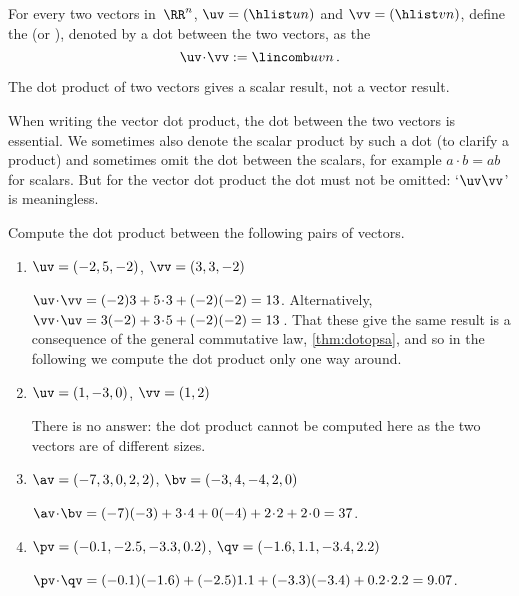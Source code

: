 \begin{definition} \label{def:dotprod}
For every two vectors in~\(\RR^n\), $\uv=(\hlist un)$ and $\vv=(\hlist vn)$,
define the  (or ), denoted by a dot between the two vectors, as the 
\begin{equation*}
\uv\cdot \vv:= \lincomb uvn\,.
\end{equation*}
\end{definition}

The dot product of two vectors gives a scalar result, not a vector result.

When writing the vector dot product, the dot between the two vectors is essential.
We sometimes also denote the scalar product by such a dot (to clarify a product) and sometimes omit the dot between the scalars, for example \(a\cdot b=ab\) for scalars. 
But for the vector dot product the dot must not be omitted: `\(\uv\vv\)' is meaningless.


\begin{example} \label{eg:}
Compute the dot product between the following pairs of vectors.
\begin{enumerate}
\item \(\uv=(-2,5,-2)\), \(\vv=(3,3,-2)\)
\begin{solution} 
\(\uv\cdot\vv=(-2)3+5\cdot3+(-2)(-2)=13\). 
Alternatively, \(\vv\cdot\uv=3(-2)+3\cdot5+(-2)(-2)=13\)\,.
That these give the same result is a consequence of the general commutative law, \autoref{thm:dotopsa}, and so in the following we compute the dot product only one way around.
\end{solution}

\item \(\uv=(1,-3,0)\), \(\vv=(1,2)\)
\begin{solution} 
There is no answer: the dot product cannot be computed here as the two vectors are of different sizes. 
\end{solution}

\item \(\av=(-7,3,0,2,2)\), \(\bv=(-3,4,-4,2,0)\)
\begin{solution} 
\(\av\cdot\bv=(-7)(-3)+3\cdot4+0(-4)+2\cdot2+2\cdot0=37\). 
\end{solution}

\item \(\pv=(-0.1,-2.5,-3.3,0.2)\), \(\qv=(-1.6,1.1,-3.4,2.2)\)
\begin{solution} 
\(\pv\cdot\qv=(-0.1)(-1.6)+(-2.5)1.1+(-3.3)(-3.4)+0.2\cdot2.2=9.07\).
\end{solution}
\end{enumerate}
\end{example}



